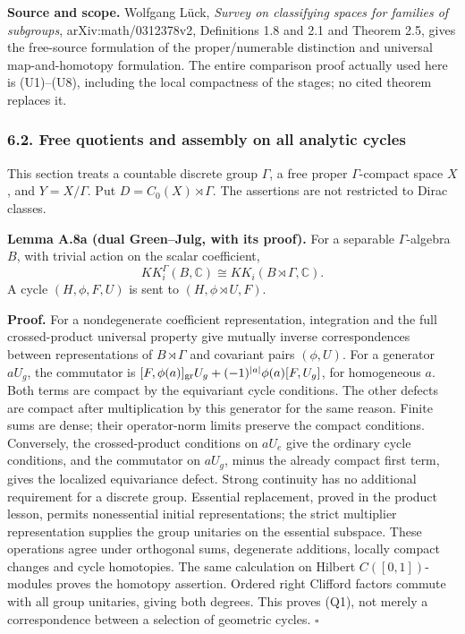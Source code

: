 \documentclass[
  11pt,
]{article}
\begin{document}
\textbf{Source and scope.} Wolfgang Lück, \emph{Survey on classifying
spaces for families of subgroups}, arXiv:math/0312378v2, Definitions 1.8
and 2.1 and Theorem 2.5, gives the free-source formulation of the
proper/numerable distinction and universal map-and-homotopy formulation.
The entire comparison proof actually used here is (U1)--(U8), including
the local compactness of the stages; no cited theorem replaces it.

\subsubsection{6.2. Free quotients and assembly on all analytic
cycles}\label{free-quotients-and-assembly-on-all-analytic-cycles}

This section treats a countable discrete group \(\Gamma\), a free proper
\(\Gamma\)-compact space \(X\), and \(Y=X/\Gamma\). Put
\(D=C_0(X)\rtimes\Gamma\). The assertions are not restricted to Dirac
classes.

\textbf{Lemma A.8a (dual Green--Julg, with its proof).} For a separable
\(\Gamma\)-algebra \(B\), with trivial action on the scalar coefficient,
\[
 KK_i^\Gamma(B,\mathbb C)\cong KK_i(B\rtimes\Gamma,\mathbb C).
 \tag{Q1}
\] A cycle \((H,\phi,F,U)\) is sent to \((H,\phi\rtimes U,F)\).

\textbf{Proof.} For a nondegenerate coefficient representation,
integration and the full crossed-product universal property give
mutually inverse correspondences between representations of
\(B\rtimes\Gamma\) and covariant pairs \((\phi,U)\). For a generator
\(aU_g\), the commutator is
\([F,\phi(a)]_{\rm gr}U_g+(-1)^{|a|}\phi(a)[F,U_g]\), for homogeneous
\(a\). Both terms are compact by the equivariant cycle conditions. The
other defects are compact after multiplication by this generator for the
same reason. Finite sums are dense; their operator-norm limits preserve
the compact conditions. Conversely, the crossed-product conditions on
\(aU_e\) give the ordinary cycle conditions, and the commutator on
\(aU_g\), minus the already compact first term, gives the localized
equivariance defect. Strong continuity has no additional requirement for
a discrete group. Essential replacement, proved in the product lesson,
permits nonessential initial representations; the strict multiplier
representation supplies the group unitaries on the essential subspace.
These operations agree under orthogonal sums, degenerate additions,
locally compact changes and cycle homotopies. The same calculation on
Hilbert \(C([0,1])\)-modules proves the homotopy assertion. Ordered
right Clifford factors commute with all group unitaries, giving both
degrees. This proves (Q1), not merely a correspondence between a
selection of geometric cycles. \(\square\)
\end{document}
